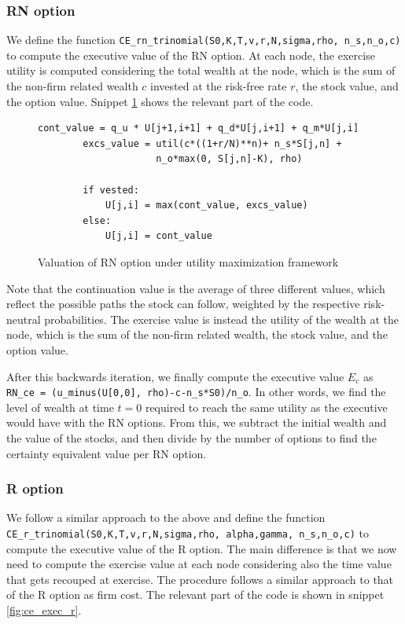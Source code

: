 \subsubsection{RN option}
We define the function \verb|CE_rn_trinomial(S0,K,T,v,r,N,sigma,rho, n_s,n_o,c)| to compute the executive value of the RN option. At each node, the exercise utility is computed considering the total wealth at the node, which is the sum of the non-firm related wealth $c$ invested at the risk-free rate $r$, the stock value, and the option value. Snippet \ref*{fig:ce_exec_rn} shows the relevant part of the code.

\begin{figure}[H]
    \begin{lstlisting}[breaklines, basicstyle=\ttfamily\small]
        cont_value = q_u * U[j+1,i+1] + q_d*U[j,i+1] + q_m*U[j,i]
        excs_value = util(c*((1+r/N)**n)+ n_s*S[j,n] + 
                     n_o*max(0, S[j,n]-K), rho)
        
        if vested:
            U[j,i] = max(cont_value, excs_value)
        else: 
            U[j,i] = cont_value
    \end{lstlisting}
 \label{fig:ce_exec_rn}
 \caption{Valuation of RN option under utility maximization framework}
\end{figure}

Note that the continuation value is the average of three different values, which reflect the possible paths the stock can follow, weighted by the respective risk-neutral probabilities. The exercise value is instead the utility of the wealth at the node, which is the sum of the non-firm related wealth, the stock value, and the option value. 

After this backwards iteration, we finally compute the executive value $E_c$ as \\
\verb|RN_ce = (u_minus(U[0,0], rho)-c-n_s*S0)/n_o|.
In other words, we find the level of wealth at time $t=0$ required to reach the same utility as the executive would have with the RN options. From this, we subtract the initial wealth and the value of the stocks, and then divide by the number of options to find the certainty equivalent value per RN option.

\subsubsection{R option}
We follow a similar approach to the above and define the function\\
\verb|CE_r_trinomial(S0,K,T,v,r,N,sigma,rho, alpha,gamma, n_s,n_o,c)| to compute the executive value of the R option. The main difference is that we now need to compute the exercise value at each node considering also the time value that gets recouped at exercise. The procedure follows a similar approach to that of the R option as firm cost. The relevant part of the code is shown in snippet \ref*{fig:ce_exec_r}.

